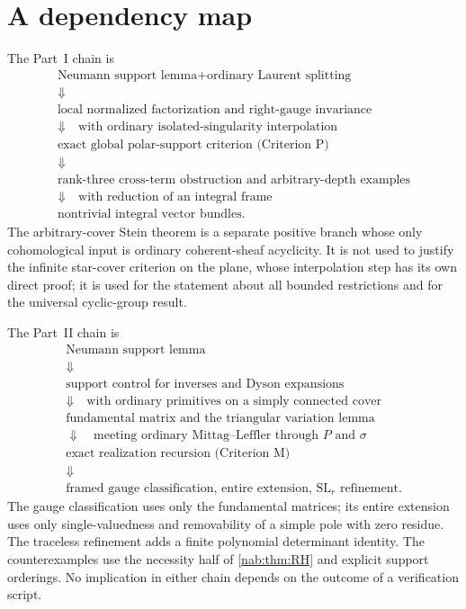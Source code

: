 \documentclass[11pt,letterpaper]{article}
\theoremstyle{definition}
\theoremstyle{remark}
\newcommand{\SL}{\operatorname{SL}}
\numberwithin{equation}{section}
\begin{document}
\section{A dependency map}\label{nab:app:dep}

The Part~I chain is
\[
\begin{gathered}
\text{Neumann support lemma}+\text{ordinary Laurent splitting}\\
\Downarrow\\
\text{local normalized factorization and right-gauge invariance}\\
\Downarrow\quad\text{with ordinary isolated-singularity interpolation}\\
\text{exact global polar-support criterion (Criterion P)}\\
\Downarrow\\
\text{rank-three cross-term obstruction and arbitrary-depth examples}\\
\Downarrow\quad\text{with reduction of an integral frame}\\
\text{nontrivial integral vector bundles.}
\end{gathered}
\]
The arbitrary-cover Stein theorem is a separate positive branch whose only
cohomological input is ordinary coherent-sheaf acyclicity. It is not used to
justify the infinite star-cover criterion on the plane, whose interpolation
step has its own direct proof; it is used for the statement about all bounded
restrictions and for the universal cyclic-group result.

The Part~II chain is
\[
\begin{gathered}
\text{Neumann support lemma}\\
\Downarrow\\
\text{support control for inverses and Dyson expansions}\\
\Downarrow\quad\text{with ordinary primitives on a simply connected cover}\\
\text{fundamental matrix and the triangular variation lemma}\\
\Downarrow\quad\text{meeting ordinary Mittag--Leffler through }P\text{ and }
\sigma\\
\text{exact realization recursion (Criterion M)}\\
\Downarrow\\
\text{framed gauge classification, entire extension, }\SL_r\text{ refinement.}
\end{gathered}
\]
The gauge classification uses only the fundamental matrices; its entire
extension uses only single-valuedness and removability of a simple pole with
zero residue. The traceless refinement adds a finite polynomial determinant
identity. The counterexamples use the necessity half of
\cref{nab:thm:RH} and explicit support orderings. No implication in either
chain depends on the outcome of a verification script.
\end{document}
